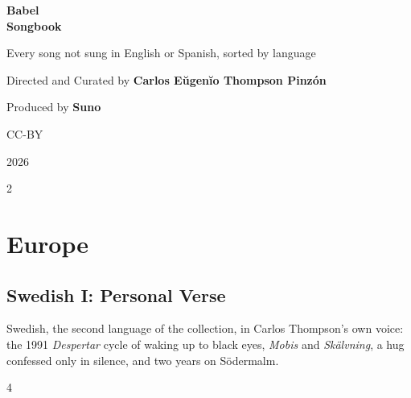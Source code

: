 \documentclass[a4paper,landscape]{memoir}
\begin{document}
\frontmatter
{}

\begin{titlingpage}
\centering
\vspace*{\fill}
{\LARGE\bfseries Babel\\\Huge Songbook\par}
\bigskip
{\large Every song not sung in English or Spanish, sorted by language\par}
\vspace*{\fill}
{\normalsize Directed and Curated by \bfseries Carlos Eŭgenĭo Thompson Pinzón\par}
{\normalsize Produced by \bfseries Suno\par}
\bigskip
{\normalsize CC-BY\par}
{\normalsize 2026\par}
\vspace*{\fill}
\end{titlingpage}

\clearpage\begin{multicols*}{2}
\tableofcontents*
\end{multicols*}
\mainmatter
\renewcommand\chaptername{Album~}

\part{Europe}

\chapter{Swedish I: Personal Verse}
Swedish, the second language of the collection, in Carlos Thompson's own voice: the 1991 \emph{Despertar} cycle of waking up to black eyes, \emph{Mobis} and \emph{Skälvning}, a hug confessed only in silence, and two years on Södermalm.
\clearpage\begin{multicols*}{4}
\end{multicols*}
\end{document}
